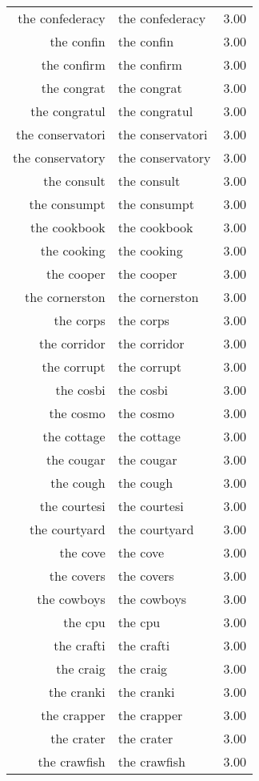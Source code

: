 \begin{table}[ht]
\begin{tabular}{rlr}
  the confederacy & the confederacy & 3.00 \\ 
  the confin & the confin & 3.00 \\ 
  the confirm & the confirm & 3.00 \\ 
  the congrat & the congrat & 3.00 \\ 
  the congratul & the congratul & 3.00 \\ 
  the conservatori & the conservatori & 3.00 \\ 
  the conservatory & the conservatory & 3.00 \\ 
  the consult & the consult & 3.00 \\ 
  the consumpt & the consumpt & 3.00 \\ 
  the cookbook & the cookbook & 3.00 \\ 
  the cooking & the cooking & 3.00 \\ 
  the cooper & the cooper & 3.00 \\ 
  the cornerston & the cornerston & 3.00 \\ 
  the corps & the corps & 3.00 \\ 
  the corridor & the corridor & 3.00 \\ 
  the corrupt & the corrupt & 3.00 \\ 
  the cosbi & the cosbi & 3.00 \\ 
  the cosmo & the cosmo & 3.00 \\ 
  the cottage & the cottage & 3.00 \\ 
  the cougar & the cougar & 3.00 \\ 
  the cough & the cough & 3.00 \\ 
  the courtesi & the courtesi & 3.00 \\ 
  the courtyard & the courtyard & 3.00 \\ 
  the cove & the cove & 3.00 \\ 
  the covers & the covers & 3.00 \\ 
  the cowboys & the cowboys & 3.00 \\ 
  the cpu & the cpu & 3.00 \\ 
  the crafti & the crafti & 3.00 \\ 
  the craig & the craig & 3.00 \\ 
  the cranki & the cranki & 3.00 \\ 
  the crapper & the crapper & 3.00 \\ 
  the crater & the crater & 3.00 \\ 
  the crawfish & the crawfish & 3.00 \\ 

\end{tabular}
\end{table}
